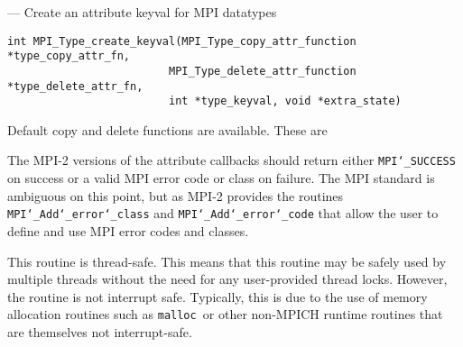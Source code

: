 \startmanpage
{}
--- Create an attribute keyval for MPI datatypes 
\startvb\begin{verbatim}
int MPI_Type_create_keyval(MPI_Type_copy_attr_function *type_copy_attr_fn, 
                         MPI_Type_delete_attr_function *type_delete_attr_fn,
                         int *type_keyval, void *extra_state)

\end{verbatim}
\endvb

\par
{}
\par
{}
\par
Default copy and delete functions are available.  These are
\par
\par
{}
The MPI-2 versions of the attribute callbacks should return either
{\tt MPI{\tt \char`\_}SUCCESS} on success or a valid MPI error code or class on failure.
The MPI standard is ambiguous on this point, but as MPI-2 provides
the routines {\tt MPI{\tt \char`\_}Add{\tt \char`\_}error{\tt \char`\_}class} and {\tt MPI{\tt \char`\_}Add{\tt \char`\_}error{\tt \char`\_}code} that allow the
user to define and use MPI error codes and classes.
\par
{}
\par
This routine is thread-safe.  This means that this routine may be
safely used by multiple threads without the need for any user-provided
thread locks.  However, the routine is not interrupt safe.  Typically,
this is due to the use of memory allocation routines such as {\tt malloc
}or other non-MPICH runtime routines that are themselves not interrupt-safe.

